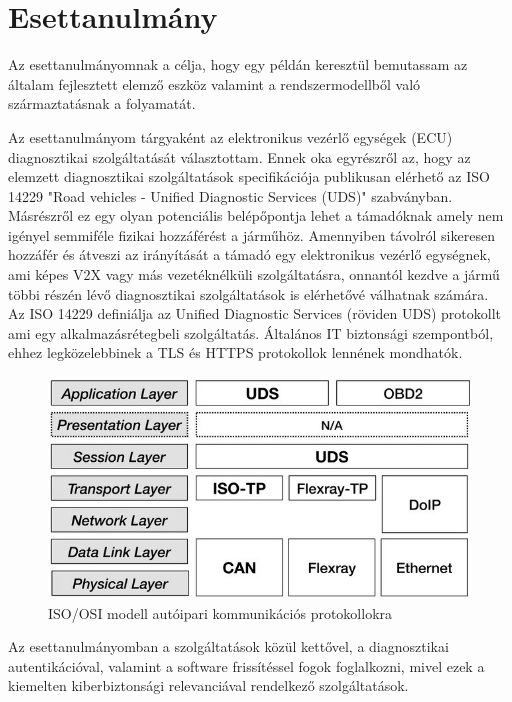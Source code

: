 \chapter{Esettanulmány}

Az esettanulmányomnak a célja, hogy egy példán keresztül bemutassam az általam fejlesztett elemző eszköz valamint a rendszermodellből való származtatásnak a folyamatát.

Az esettanulmányom tárgyaként az elektronikus vezérlő egységek (ECU) diagnosztikai szolgáltatását választottam. Ennek oka egyrészről az, hogy az elemzett diagnosztikai szolgáltatások specifikációja publikusan elérhető az ISO 14229 "Road vehicles - Unified Diagnostic Services (UDS)" \cite{ISO14229} szabványban. Másrészről ez egy olyan potenciális belépőpontja lehet a támadóknak amely nem igényel semmiféle fizikai hozzáférést a járműhöz. Amennyiben távolról sikeresen hozzáfér és átveszi az irányítását a támadó egy elektronikus vezérlő egységnek, ami képes V2X vagy más vezetéknélküli szolgáltatásra, onnantól kezdve a jármű többi részén lévő diagnosztikai szolgáltatások is elérhetővé válhatnak számára.\\

Az ISO 14229\cite{ISO14229} definiálja az Unified Diagnostic Services (röviden UDS) protokollt ami egy alkalmazásrétegbeli szolgáltatás. Általános IT biztonsági szempontból, ehhez legközelebbinek a TLS és HTTPS protokollok lennének mondhatók.

\begin{figure}[!ht]
	\centering
	\includegraphics[width=120mm, keepaspectratio]{figures/06_isoosi.jpg}
	\caption{ISO/OSI modell autóipari kommunikációs protokollokra\cite{ISOOSI}}
\end{figure}

Az esettanulmányomban a szolgáltatások közül kettővel, a diagnosztikai autentikációval, valamint a software frissítéssel fogok foglalkozni, mivel ezek a kiemelten kiberbiztonsági relevanciával rendelkező szolgáltatások.\\

